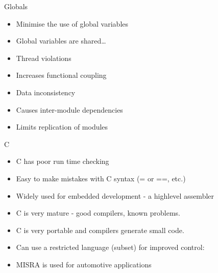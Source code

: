 \documentclass{beamer}
\begin{document}
\begin{frame}{Globals}
  \begin{itemize}
  \item Minimise the use of global variables
  \item Global variables are shared…
  \item Thread violations
  \item Increases functional coupling
  \item Data inconsistency
  \item Causes inter-module dependencies
  \item Limits replication of modules
  \end{itemize}
\end{frame}


\begin{frame}{C}
  \begin{itemize}
  \item C has poor run time checking
  \item Easy to make mistakes with C syntax (= or ==, etc.)
  \item Widely used for embedded development - a highlevel assembler
  \item C is very mature - good compilers, known problems.
  \item C is very portable and compilers generate small code.
  \item Can use a restricted language (subset) for improved control:
  \item MISRA is used for automotive applications
  \end{itemize}
\end{frame}
\end{document}
